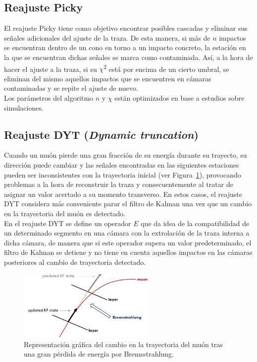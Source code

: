 \subsection{Reajuste Picky}\label{sec:Picky}

El reajuste Picky tiene como objetivo encontrar posibles cascadas y eliminar sus se\~nales adicionales del ajuste de la traza. De esta manera, si m\'as de $n$ impactos se encuentran dentro de un cono en torno a un impacto concreto, la estaci\'on en la que se encuentran dichas se\~nales se marca como contaminada. As\'i, a la hora de hacer el ajuste a la traza, si su $\chi$\textsuperscript{2} est\'a por encima de un cierto umbral, se eliminan del mismo aquellos impactos que se encuentren en c\'amaras contaminadas y se repite el ajuste de nuevo. \\
Los par\'ametros del algoritmo $n$ y $\chi$ est\'an optimizados en base a estudios sobre simulaciones.

\subsection{Reajuste DYT (\textit{Dynamic truncation})}\label{sec:DYT}

Cuando un mu\'on pierde una gran fracci\'on de su energ\'ia durante su trayecto, su direcci\'on puede cambiar y las se\~nales encontradas en las siguientes estaciones pueden ser inconsistentes con la trayectoria inicial (ver Figura~\ref{fig:energyloss}), provocando problemas a la hora de reconstruir la traza y consecuentemente al tratar de asignar un valor acertado a su momento transverso. En estos casos, el reajuste DYT considera m\'as conveniente parar el filtro de Kalman una vez que un cambio en la trayectoria del mu\'on es detectado. \\
En el reajuste DYT se define un operador $E$ que da idea de la compatibilidad de un determinado segmento en una c\'amara con la extrolaci\'on de la traza interna a dicha c\'amara, de manera que si este operador supera un valor predeterminado, el filtro de Kalman se detiene y no tiene en cuenta aquellos impactos en las c\'amaras posteriores al cambio de trayectoria detectado. 

\begin{figure}[h]
\centering
\includegraphics[width=0.60\textwidth]{figures/energyloss.png}
\caption{Representaci\'on gr\'afica del cambio en la trayectoria del mu\'on tras una gran p\'erdida de energ\'ia por Bremsstrahlung.}
\label{fig:energyloss}        
\end{figure}



